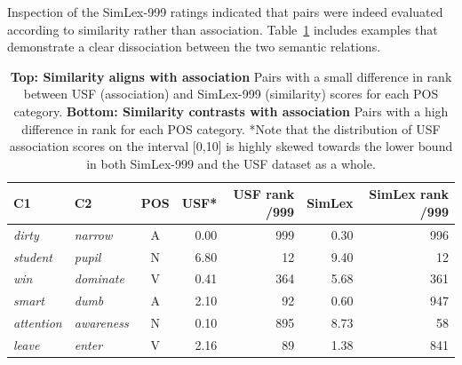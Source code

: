 Inspection of the SimLex-999 ratings indicated that pairs were indeed evaluated according to similarity rather than association. Table~\ref{tab2} includes examples that demonstrate a clear dissociation between the two semantic relations. 



 \begin{table}[t]\begin{center}\begin{tabular}{l|l|c|r|r|r|r}





C1 & C2 & POS & USF* & USF rank \scriptsize{/999} & SimLex & SimLex rank \scriptsize{/999} \\



\hline \emph{dirty} & \emph{narrow} & A & 0.00 & 999 & 0.30 & 996 \\



\emph{student} & \emph{pupil} & N & 6.80 & 12 & 9.40 & 12 \\

\emph{win} & \emph{dominate} & V & 0.41 & 364 & 5.68 & 361 \\



\hdashline \emph{smart} & \emph{dumb} & A & 2.10 & 92 & 0.60 & 947 \\

\emph{attention} & \emph{awareness} & N &  0.10 & 895 & 8.73 & 58 \\

\emph{leave} & \emph{enter} & V & 2.16 & 89 & 1.38 & 841 \\
\end{tabular}
\end{center}\caption{\label{tab2} {\bf Top:  Similarity aligns with association} Pairs with a small difference in rank between USF (association) and SimLex-999 (similarity) scores for each POS category. {\bf Bottom: Similarity contrasts with association} Pairs with a high difference in rank for each POS category. *Note that the distribution of USF association scores on the interval [0,10] is highly skewed towards the lower bound in both SimLex-999 and the USF dataset as a whole.}\end{table}


